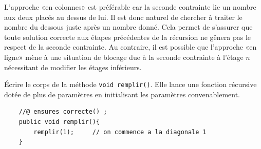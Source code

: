 \documentclass[10pt]{article}\usepackage[correction,nu]{esial}
\begin{document}
L'approche «en colonnes» est préférable car la seconde contrainte lie un nombre
aux deux placés au dessus de lui. Il est donc naturel de chercher à traiter le
nombre du dessous juste après un nombre donné. Cela permet de s'assurer que
toute solution correcte aux étapes précédentes de la récursion ne gênera pas le
respect de la seconde contrainte. Au contraire, il est possible que l'approche
«en ligne» mène à une situation de blocage due à la seconde contrainte à
l'étage $n$ nécessitant de modifier les étages inférieurs.
\begin{Question}
  Écrire le corps de la méthode \texttt{void remplir()}. Elle lance une
  fonction récursive dotée de plus de paramètres en initialisant les paramètres
  convenablement.
\end{Question}
\begin{Reponse}
\begin{verbatim}
    //@ ensures correcte() ;
    public void remplir(){
        remplir(1); 	// on commence a la diagonale 1
    } 
\end{verbatim}
\end{Reponse}
\end{document}
